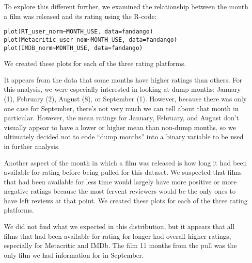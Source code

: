 \documentclass[letter,12pt]{article}
\begin{document}
	To explore this different further, we examined the relationship between the month a film was released and its rating using the R-code:
	\begin{verbatim}
plot(RT_user_norm~MONTH_USE, data=fandango)
plot(Metacritic_user_nom~MONTH_USE, data=fandango)
plot(IMDB_norm~MONTH_USE, data=fandango)
	\end{verbatim}
	We created these plots for each of the three rating platforms.
	\begin{center}
	\end{center}
	It appears from the data that some months have higher ratings than others. For this analysis, we were especially interested in looking at dump months: January (1), February (2), August (8), or September (1). However, because there was only one case for September, there’s not very much we can tell about that month in particular. However, the mean ratings for January, February, and August don’t visually appear to have a lower or higher mean than non-dump months, so we ultimately decided not to code “dump months” into a binary variable to be used in further analysis. 

	Another aspect of the month in which a film was released is how long it had been available for rating before being pulled for this dataset. We suspected that films that had been available for less time would largely have more positive or more negative ratings because the most fervent reviewers would be the only ones to have left reviews at that point. 
	We created these plots for each of the three rating platforms.
	\begin{center}
	\end{center}
	We did not find what we expected in this distribution, but it appears that all films that had been available for rating for longer had overall higher ratings, especially for Metacritic and IMDb. The film 11 months from the pull was the only film we had information for in September. 
\end{document}
